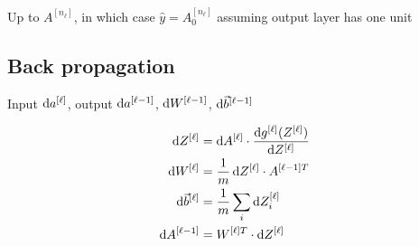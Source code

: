 \documentclass[12pt]{article}
\begin{document}
Up to $A^{[n_{\ell}]}$, in which case $\hat{y} = A^{[n_{\ell}]}_0$ assuming output layer has one unit

\subsection{Back propagation}

Input $\mathop{}\!\mathrm{d} a^{[\ell]}$, output $\mathop{}\!\mathrm{d} a^{[\ell-1]}$, $\mathop{}\!\mathrm{d} W^{[\ell-1]}$, $\mathop{}\!\mathrm{d} \vec{b}^{[\ell-1]}$

\begin{align*}
    \dif Z^{[\ell]} &= \dif A^{[\ell]} \cdot \frac{\dif g^{[\ell]}(Z^{[\ell]})}{\dif Z^{[\ell]}}\\
    \dif W^{[\ell]} &= \frac{1}{m} \dif Z^{[\ell]} \cdot A^{[\ell-1] T}\\
    \dif \vec{b}^{[\ell]} &= \frac{1}{m} \sum_i \dif Z^{[\ell]}_i\\
    \dif A^{[\ell-1]} &= W^{[\ell] T} \cdot \dif Z^{[\ell]}
\end{align*}
\end{document}
